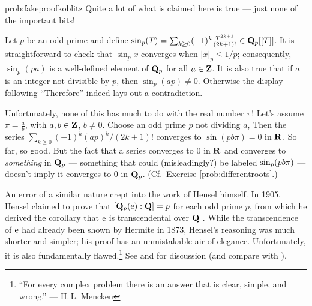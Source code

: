 \begin{sol}{prob:fakeproofkoblitz} Quite a lot of what is claimed here is true --- just none of the important bits!

Let $p$ be an odd prime and define $\mathrm{sin}_p(T)= \sum_{k \ge 0} (-1)^k \frac{T^{2k+1}}{(2k+1)!} \in \mathbf{Q}_p[[T]]$. It is straightforward to check that $\sin_p{x}$ converges when $|x|_p \le 1/p$; consequently, $\sin_p(pa)$ is a well-defined element of $\mathbf{Q}_p$ for all $a \in \mathbf{Z}$. It is also true that if $a$ is an integer not divisible by $p$, then $\sin_p(ap) \ne 0$. Otherwise the display following ``Therefore'' indeed lays out a contradiction.

Unfortunately, none of this has much to do with the real number $\pi$! Let's assume $\pi = \frac{a}{b}$, with $a, b \in \mathbf{Z}$, $b\ne 0$. Choose an odd prime $p$ not dividing $a$, Then the series $\sum_{k\ge 0} (-1)^k (ap)^k/(2k+1)!$ converges to $\sin(pb\pi) = 0$ in $\mathbf{R}$. So far, so good. But the fact that a series converges to $0$ in $\mathbf{R}$ and converges to \emph{something} in $\mathbf{Q}_p$ --- something that could (misleadingly?) be labeled $\mathrm{sin}_p(pb\pi)$ --- doesn't imply it converges to $0$ in $\mathbf{Q}_p$.  (Cf.~Exercise \ref{prob:differentroots}.)
\end{sol}


\begin{rmk} An error of a similar nature crept into the work of Hensel himself. In 1905, Hensel claimed to prove that $[\mathbf{Q}_p(\mathrm{e}):\mathbf{Q}]= p$ for each odd prime $p$, from which he derived the corollary that $\mathrm{e}$ is transcendental over $\mathbf{Q}$ \cite{hensel}. While the transcendence of $\mathrm{e}$ had already been shown by Hermite in 1873, Hensel's reasoning was much shorter and simpler; his proof has an unmistakable air of elegance. Unfortunately, it is also fundamentally flawed.\footnote{``For every complex problem there is an answer that is clear, simple, and wrong.'' --- {H.\,L.} Mencken} See \cite{ullrich} and \cite[\S5.6]{petri} for discussion (and compare with \cite[Exercise 9, p.~84]{koblitz}).
\end{rmk}


